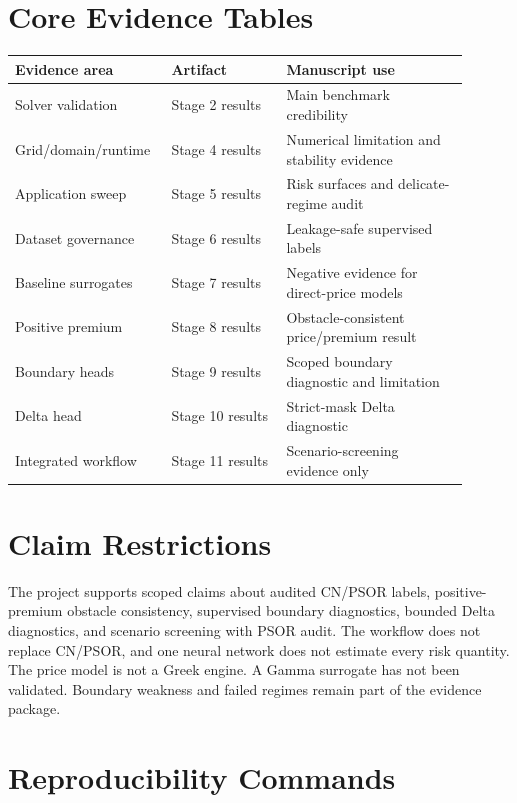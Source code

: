 \documentclass[11pt]{article}
\begin{document}
\section{Core Evidence Tables}

\begin{longtable}{p{0.28\linewidth}p{0.24\linewidth}p{0.38\linewidth}}
\toprule
Evidence area & Artifact & Manuscript use \\
\midrule
Solver validation & Stage 2 results & Main benchmark credibility \\
Grid/domain/runtime & Stage 4 results & Numerical limitation and stability evidence \\
Application sweep & Stage 5 results & Risk surfaces and delicate-regime audit \\
Dataset governance & Stage 6 results & Leakage-safe supervised labels \\
Baseline surrogates & Stage 7 results & Negative evidence for direct-price models \\
Positive premium & Stage 8 results & Obstacle-consistent price/premium result \\
Boundary heads & Stage 9 results & Scoped boundary diagnostic and limitation \\
Delta head & Stage 10 results & Strict-mask Delta diagnostic \\
Integrated workflow & Stage 11 results & Scenario-screening evidence only \\
\bottomrule
\end{longtable}

\section{Claim Restrictions}

The project supports scoped claims about audited CN/PSOR labels,
positive-premium obstacle consistency, supervised boundary diagnostics, bounded
Delta diagnostics, and scenario screening with PSOR audit. The workflow does
not replace CN/PSOR, and one neural network does not estimate every risk
quantity. The price model is not a Greek engine. A Gamma surrogate has not been
validated. Boundary weakness and failed regimes remain part of the evidence
package.

\section{Reproducibility Commands}
\end{document}
